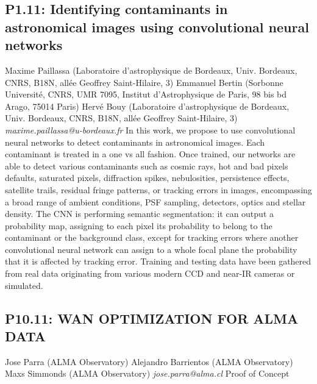 \documentclass{report}
\begin{document}
\subsection*{P1.11: Identifying contaminants in astronomical images using convolutional neural networks}
\bigskip
Maxime Paillassa (Laboratoire d’astrophysique de Bordeaux, Univ. Bordeaux, CNRS, B18N, allée Geoffrey Saint-Hilaire, 3) \newline Emmanuel Bertin (Sorbonne Université, CNRS, UMR 7095, Institut d’Astrophysique de Paris, 98 bis bd Arago, 75014 Paris) \newline  Hervé Bouy (Laboratoire d’astrophysique de Bordeaux, Univ. Bordeaux, CNRS, B18N, allée Geoffrey Saint-Hilaire, 3)\newline   \newline  \newline  \newline\newline
{\it maxime.paillassa@u-bordeaux.fr}\newline
\newline\newline
In this work, we propose to use convolutional neural networks to detect contaminants in astronomical images. Each contaminant is treated in a one vs all fashion. Once trained, our networks are able to detect various contaminants such as cosmic rays, hot and bad pixels defaults, saturated pixels, diffraction spikes, nebulosities, persistence effects, satellite trails, residual fringe patterns, or tracking errors in images, encompassing a broad range of ambient conditions, PSF sampling, detectors, optics and stellar density. The CNN is performing semantic segmentation: it can output a probability map, assigning to each pixel its probability to belong to the contaminant or the background class, except for tracking errors where another convolutional neural network can assign to a whole focal plane the probability that it is affected by tracking error. Training and testing data have been gathered from real data originating from various modern CCD and near-IR cameras or simulated.\newline
\newpage
\subsection*{P10.11: WAN OPTIMIZATION FOR ALMA DATA}
\bigskip
Jose Parra (ALMA Observatory) \newline Alejandro Barrientos (ALMA Observatory) \newline  Maxs Simmonds (ALMA Observatory)\newline   \newline  \newline  \newline\newline
{\it jose.parra@alma.cl}\newline
\newline\newline
Proof of Concept
 
\end{document}

